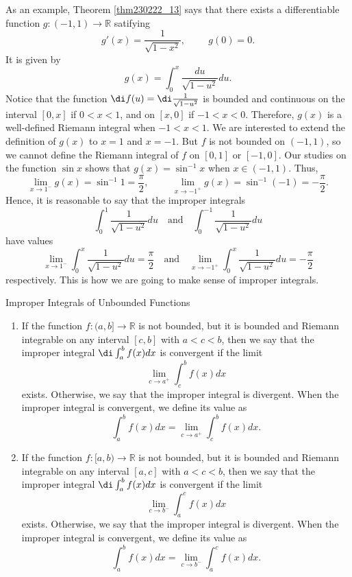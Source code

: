 \begin{example}[label=20230527]{}
As an example,  Theorem  \ref{thm230222_13} says that there exists a differentiable function $g:(-1,1)\to\mathbb{R}$ satifying
\[g'(x)=\frac{1}{\sqrt{1-x^2}},\hspace{1cm}g(0)=0.\]It is given by
\[g(x)=\int_0^x\frac{du}{\sqrt{1-u^2}}du.\]
Notice that the function $\di f(u)=\di\frac{1}{\sqrt{1-u^2}}$ is bounded and continuous on the interval $[0,x]$ if $0< x<1$, and on $[x,0]$ if $-1<x<0$. Therefore, $g(x)$ is a well-defined Riemann integral when $-1<x<1$. We are interested to extend the definition of $g(x)$ to $x= 1$ and $x=-1$. But $f$ is not bounded on $(-1,1)$, so we cannot define the Riemann integral of $f$ on $[0, 1]$ or $[-1,0]$.  Our studies on the function $\sin x$ shows that $g(x)=\sin^{-1}x$ when $x\in(-1,1)$. Thus,
\[\lim_{x\to 1^-}g(x)=\sin^{-1}1=\frac{\pi}{2},\hspace{1cm}\lim_{x\to -1^+}g(x)=\sin^{-1}(-1)=-\frac{\pi}{2}.\]
Hence, it is reasonable to say that the improper integrals 
\[\int_0^{1}\frac{1}{\sqrt{1-u^2}}du\quad\text{and}\quad \int_0^{-1}\frac{1}{\sqrt{1-u^2}}du\] have values
\[\lim_{x\to 1^-}\int_0^{x}\frac{1}{\sqrt{1-u^2}}du=\frac{\pi}{2}\quad\text{and}\quad\lim_{x\to -1^+}\int_0^{x}\frac{1}{\sqrt{1-u^2}}du=-\frac{\pi}{2}\]respectively. This is how we are going to make sense of improper integrals.  
\begin{definition}
{Improper Integrals of Unbounded Functions}
\begin{enumerate}[1.]
\item
If the function $f:(a, b]\to\mathbb{R}$ is not bounded, but it is bounded and Riemann integrable on any interval $[c,b]$ with $a<c<b$, then we say that the improper integral $\di\int_a^bf(x)dx$ is convergent if  the limit
\[\lim_{c\to a^+}\int_c^bf(x)dx\]   exists. Otherwise, we say that the improper integral   is divergent. When the improper integral is convergent, we define its value as
\[ \int_a^bf(x)dx=\lim_{c\to a^+}\int_c^bf(x)dx.\] 
\item If the function $f:[a, b)\to\mathbb{R}$ is not bounded, but it is bounded and Riemann integrable on any interval $[a,c]$ with $a<c<b$, then we say that the improper integral $\di\int_a^bf(x)dx$ is convergent if  the limit
\[\lim_{c\to b^-}\int_a^cf(x)dx\]   exists. Otherwise, we say that the improper integral   is divergent. When the improper integral is convergent, we define its value as
\[ \int_a^bf(x)dx=\lim_{c\to b^-}\int_a^cf(x)dx.\] 

\end{enumerate}
\end{definition}


\end{example}
